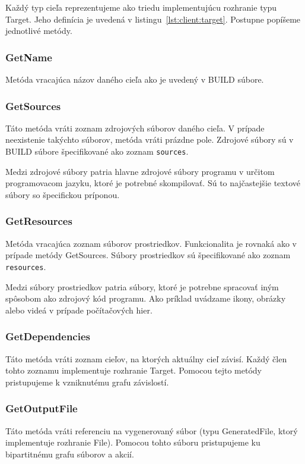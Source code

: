 Každý typ cieľa reprezentujeme ako triedu implementujúcu rozhranie typu Target.
Jeho definícia je uvedená v listingu~\ref{lst:client:target}. Postupne popíšeme
jednotlivé metódy.

\subsubsection{GetName}
Metóda vracajúca názov daného cieľa ako je uvedený v BUILD súbore.

\subsubsection{GetSources}
Táto metóda vráti zoznam zdrojových súborov daného cieľa. V prípade neexistenie
takýchto súborov, metóda vráti prázdne pole. Zdrojové súbory sú v BUILD súbore
špecifikované ako zoznam \texttt{sources}.

Medzi zdrojové súbory patria hlavne zdrojové súbory programu v určitom
programovacom jazyku, ktoré je potrebné skompilovať. Sú to najčastejšie textové
súbory so špecifickou príponou.

\subsubsection{GetResources}
Metóda vracajúca zoznam súborov prostriedkov. Funkcionalita je rovnaká ako v
prípade metódy GetSources. Súbory prostriedkov sú špecifikované ako zoznam
\texttt{resources}.

Medzi súbory prostriedkov patria súbory, ktoré je potrebne spracovať iným spôsobom
ako zdrojový kód programu. Ako príklad uvádzame ikony, obrázky alebo videá v
prípade počítačových hier.

\subsubsection{GetDependencies}
Táto metóda vráti zoznam cieľov, na ktorých aktuálny cieľ závisí. Každý člen
tohto zoznamu implementuje rozhranie Target. Pomocou tejto metódy pristupujeme
k vzniknutému grafu závislostí.

\subsubsection{GetOutputFile}
Táto metóda vráti referenciu na vygenerovaný súbor (typu GeneratedFile, ktorý
implementuje rozhranie File). Pomocou tohto súboru pristupujeme ku bipartitnému
grafu súborov a akcií.

